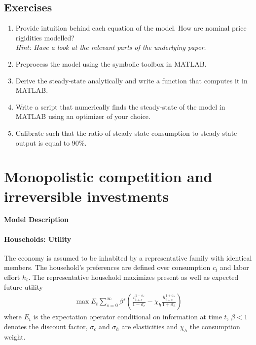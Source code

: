 \documentclass[a4paper]{scrartcl}
\begin{document}
\subsection*{Exercises}

\begin{enumerate}

\item
Provide intuition behind each equation of the model. How are nominal price rigidities modelled?\\\emph{Hint: Have a look at the relevant parts of the underlying paper.}

\item
Preprocess the model using the symbolic toolbox in MATLAB.

\item
Derive the steady-state analytically and write a function that computes it in {MATLAB}.

\item
Write a script that numerically finds the steady-state of the model in {MATLAB} using an optimizer of your choice.

\item
Calibrate such that the ratio of steady-state consumption to steady-state output is equal to 90\%.

\end{enumerate}

\newpage

\section[Monopolistic competition and irreversible investments]{Monopolistic competition and irreversible investments\label{ex:RBCModelMonCompIrrInvest}}

\begin{center} \Large \textbf{Model Description} \end{center}

\paragraph{Households: Utility}
The economy is assumed to be inhabited by a representative family with identical members.
The household's preferences are defined over consumption \(c_t\) and labor effort \(h_t\).
The representative household maximizes present as well as expected future utility
\begin{align}
\max E_t \sum_{s=0}^{\infty} \beta^{s} \left( \frac{c_{t+s}^{1-\sigma_c}}{1-\sigma_c} - \chi_h \frac{h_{t+s}^{1+\sigma_h}}{1+\sigma_h} \right)\label{eq:RBCMonopIrrInv.UtilityLifetime}
\end{align}
where \(E_t\) is the expectation operator conditional on information at time \(t\),
  \(\beta <1\) denotes the discount factor,
  \(\sigma_c\) and \(\sigma_h\) are elasticities and \(\chi_h\) the consumption weight.
\end{document}
